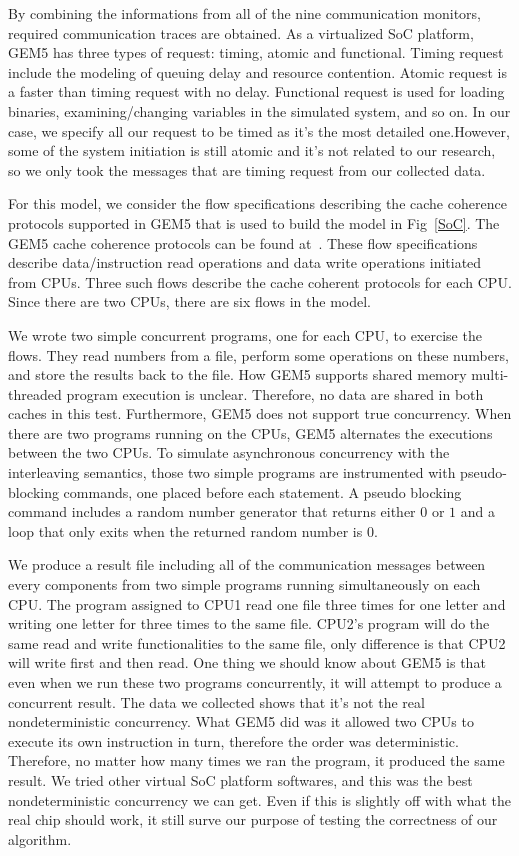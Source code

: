 \documentclass[12pt,frontmatter,copyright,thesis]{usfmanus}
\begin{document}
By combining the informations from all of the nine communication monitors, required communication traces are obtained. As a virtualized SoC platform, GEM5 has three types of request: timing, atomic and functional. Timing request include the modeling of queuing delay and resource contention. Atomic request is a faster than timing request with no delay.  Functional request is used for loading binaries, examining/changing variables in the simulated system, and so on. In our case, we specify all our request to be timed as it's the most detailed one.However, some of the system initiation is still atomic and it's not related to our research, so we only took the messages that are timing request from our collected data. 


For this model, we consider the flow specifications
describing the cache coherence protocols supported in
GEM5 that is used to build the model in Fig~\ref{SoC}.
The GEM5 cache coherence protocols can be found at~\cite{gem5}.
These flow specifications describe data/instruction read
operations and data write operations initiated from CPUs.
Three such flows describe the cache coherent protocols for
each CPU.  Since there are two CPUs, there are six flows in
the model.



We wrote two simple concurrent programs, one for each CPU,
 to exercise the flows.  They read numbers from a file,
perform some operations on these numbers, and store the
results back to the file.  How GEM5 supports shared memory
multi-threaded program execution is unclear.  Therefore,
no data are shared in both caches in this test.
Furthermore, GEM5 does not support true concurrency.  When
there are two programs running on the CPUs, GEM5 alternates
the executions between the two CPUs.  To simulate
asynchronous concurrency with the interleaving semantics,
those two simple programs are instrumented with
pseudo-blocking commands, one placed before each statement.
A pseudo blocking command includes a random number generator
that returns either $0$ or $1$ and a loop that only exits
when the returned random number is $0$.

We produce a result file including all of the communication messages between every components from two simple programs running simultaneously on each CPU.  The program assigned to CPU1 read one file three times for one letter and writing one letter for three times to the same file. CPU2's program will do the same read and write functionalities to the same file, only difference is that CPU2 will write first and then read. One thing we should know about GEM5 is that even when we run these two programs concurrently, it will attempt to produce a concurrent result. The data we collected shows that it's not the real nondeterministic concurrency. What GEM5 did was it allowed two CPUs to execute its own instruction in turn, therefore the order was deterministic. Therefore, no matter how many times we ran the program, it produced the same result. We tried other virtual SoC platform softwares, and this was the best nondeterministic concurrency we can get. Even if this is slightly off with what the real chip should work, it still surve our purpose of testing the correctness of our algorithm.
\end{document}
